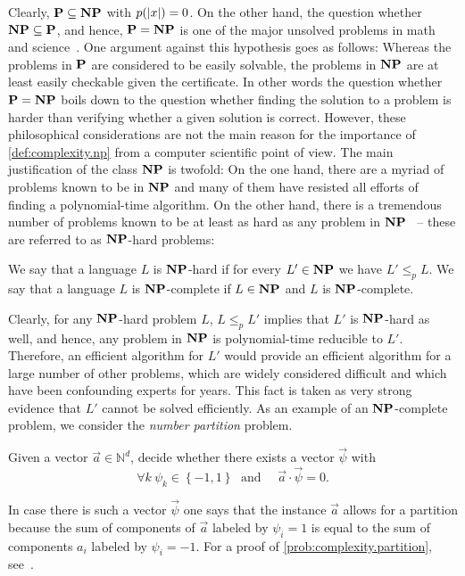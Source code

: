 Clearly, $\P \subset \NP$ with $p(\abs{x}) = 0$.
On the other hand, the question whether $\NP \subset \P$, and hence, $\P = \NP$ is one of the major unsolved problems in math and science~\cite{Cook_2000_P,Aaronson_????_P,Garey_2002_Computers}.
One argument against this hypothesis goes as follows:
Whereas the problems in $\P$ are considered to be easily solvable, the problems in $\NP$ are at least easily checkable given the certificate.
In other words the question whether $\P = \NP$ boils down to the question whether finding the solution to a problem is harder than verifying whether a given solution is correct.
However, these philosophical considerations are not the main reason for the importance of \cref{def:complexity.np} from a computer scientific point of view.
The main justification of the class $\NP$ is twofold:
On the one hand, there are a myriad of problems known to be in $\NP$ and many of them have resisted all efforts of finding a polynomial-time algorithm.
On the other hand, there is a tremendous number of problems known to be at least as hard as any problem in $\NP$~\cite{Garey_2002_Computers} -- these are referred to as $\NP$-hard problems:

\begin{definition}
  \label{def:complexity.hard_and_complete}
  We say that a language $L$ is $\NP$-hard if for every $L' \in \NP$ we have $L' \le_p L$.
  We say that a language $L$ is $\NP$-complete if $L \in \NP$ and $L$ is $\NP$-complete.
\end{definition}

Clearly, for any $\NP$-hard problem $L$, $L \le_p L'$ implies that $L'$ is $\NP$-hard as well, and hence, any problem in $\NP$ is polynomial-time reducible to $L'$.
Therefore, an efficient algorithm for $L'$ would provide an efficient algorithm for a large number of other problems, which are widely considered difficult and which have been confounding experts for years.
This fact is taken as very strong evidence that $L'$ cannot be solved efficiently.
As an example of an $\NP$-complete problem, we consider the \emph{number partition} problem.
\begin{problem}\label{prob:complexity.partition}
  Given a vector $\vec a \in \mathbb{N}^d$, decide whether there exists a vector $\vec \psi$ with
  \[
    \forall{k}\:\psi_{k}\in\left\{ -1,1\right\} \;\textrm{ and }\quad \vec a \cdot \vec\psi=0.
    \label{eq:ellpos.partition_vector}
  \]
\end{problem}
In case there is such a vector $\vec \psi$ one says that the instance $\vec a$ allows for a partition because the sum of components of $\vec a$ labeled by $\psi_i = 1$ is equal to the sum of components $a_i$ labeled by $\psi_i = -1$.
For a proof of \cref{prob:complexity.partition}, see~\cite{Garey_2002_Computers}.\\


